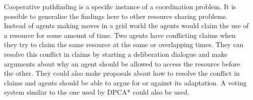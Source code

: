 Cooperative pathfinding is a specific instance of a coordination problem. It is
possible to generalise the findings here to other resource sharing problems.
Instead of agents making moves in a grid world the agents would claim the use
of a resource for some amount of time. Two agents have conflicting claims when
they try to claim the same resource at the same or overlapping times. They can
resolve this conflict in claims by starting a deliberation dialogue and make
arguments about why an agent should be allowed to access the resource before
the other. They could also make proposals about how to resolve the conflict in
claims and agents should be able to argue for or against its adaptation. A
voting system similar to the one used by DPCA* could also be used.



